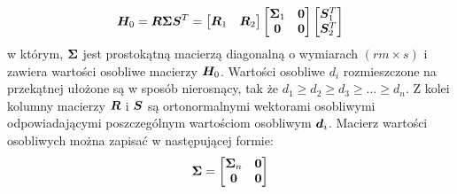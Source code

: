 \begin{equation} \label{eq: SVDHzero}
	\bm{H}_0 = \bm{R}\bm{\Sigma} \bm{S}^T = \begin{bmatrix}
		\bm{R}_1 & \bm{R}_2
	\end{bmatrix}\begin{bmatrix}
		\bm{\Sigma}_1 & \bm{0} \\
		\bm{0} & \bm{0} 
	\end{bmatrix}\begin{bmatrix}
		\bm{S}_1^T \\
		\bm{S}_2^T 
	\end{bmatrix}
\end{equation}
w którym, $\bm{\Sigma}$ jest prostokątną macierzą diagonalną o wymiarach $(rm\times s)$ i zawiera wartości osobliwe macierzy $\bm{H}_0$. Wartości osobliwe $d_i$ rozmieszczone na przekątnej ułożone są w sposób nierosnący, tak że $d_1\ge d_2\ge d_3\ge\dots\ge d_n$. Z kolei kolumny macierzy $\bm{R}$ i $\bm{S}$ są ortonormalnymi wektorami osobliwymi odpowiadającymi poszczególnym wartościom osobliwym $\bm{d}_i$. Macierz wartości osobliwych można zapisać w następującej formie:
\begin{equation}
	\bm{\Sigma} = \begin{bmatrix}
		\bm{\Sigma}_n & \bm{0} \\
		\bm{0} & \bm{0}
	\end{bmatrix}
\end{equation}

